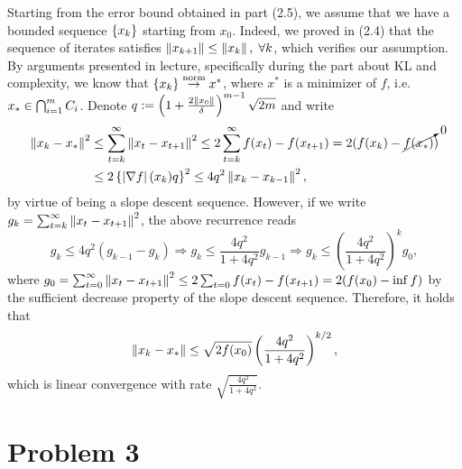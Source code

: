 \documentclass[10pt]{article}
\begin{document}
Starting from the error bound obtained in part (2.5), we assume that we have
a bounded sequence $\left\{ x_k \right\}$ starting from $x_0$. Indeed, we proved in (2.4)
that the sequence of iterates satisfies $\left \| x_{k+1} \right \| \leq \left \| x_k \right \|, \;
\forall k$, which verifies our assumption. By arguments presented in lecture,
specifically during the part about KL and complexity, we know that $\left\{ x_k \right\}
\overset{\text{norm}}{\to} x^*$, where $x^*$ is a minimizer of $f$, i.e.
$x_* \in \operatorname*{\bigcap}_{i=1}^m C_i$. Denote
\(
    q := \left(1 + \frac{2 \left \| x_0 \right \|}{\delta}\right)^{m-1} \sqrt{2m}
\) and write
\begin{align*}
    \left \| x_k - x_* \right \|^2 &\leq \sum_{t=k}^{\infty} \left \| x_t - x_{t + 1} \right \|^2
    \leq 2 \sum_{t=k}^{\infty} f(x_t) - f(x_{t+1}) = 2 (f(x_k) -
    \cancelto{0}{f(x_*)}) \\
    &\leq 2 \left\{  \left| \nabla f \right|(x_k) q  \right\}^2 \leq 4q^2 \left \| x_k -
    x_{k-1} \right \|^2,
\end{align*}
by virtue of being a slope descent sequence. However, if we write $g_k =
\sum_{t=k}^{\infty} \left \| x_t - x_{t+1} \right \|^2$, the above recurrence reads
\[
    g_k \leq 4 q^2 \left(g_{k-1} - g_{k}\right) \Rightarrow
    g_k \leq \frac{4q^2}{1 + 4q^2} g_{k-1} \Rightarrow
    g_k \leq \left(\frac{4q^2}{1 + 4q^2}\right)^k g_0,
\]
where $g_0 = \sum_{t=0}^{\infty} \left \| x_t - x_{t+1} \right \|^2
\leq 2 \sum_{t=0} f(x_t) - f(x_{t+1}) = 2 (f(x_0) - \inf f)$ by the sufficient
decrease property of the slope descent sequence. Therefore, it holds that
\[
    \left \| x_k - x_* \right \| \leq \sqrt{2 f(x_0)} \left( \frac{4q^2}{1 + 4 q^2}
    \right)^{k/2},
\]
which is linear convergence with rate $\sqrt{\frac{4q^2}{1 + 4q^2}}$.
\section*{Problem 3}
\end{document}
